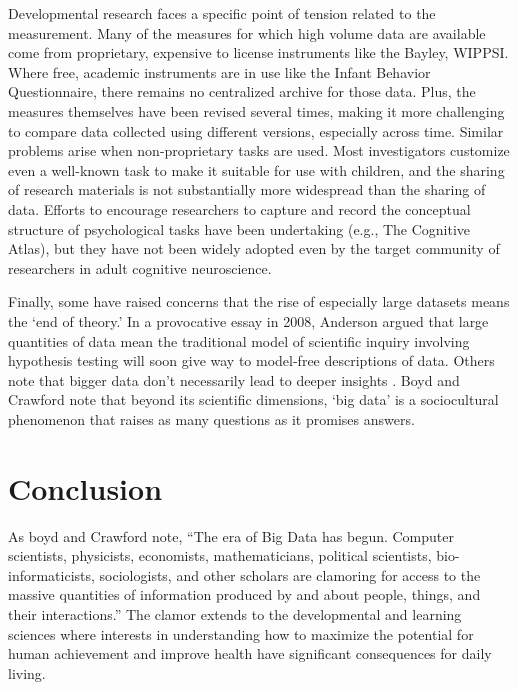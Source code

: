 \documentclass[letterpaper,man,apacite]{apa6}
\begin{document}
Developmental research faces a specific point of tension related to the measurement.
Many of the measures for which high volume data are available come from proprietary, expensive to license instruments like the Bayley, WIPPSI.
Where free, academic instruments are in use like the Infant Behavior Questionnaire, there remains no centralized archive for those data.
Plus, the measures themselves have been revised several times, making it more challenging to compare data collected using different versions, especially across time.
Similar problems arise when non-proprietary tasks are used.
Most investigators customize even a well-known task to make it suitable for use with children, and the sharing of research materials is not substantially more widespread than the sharing of data.
Efforts to encourage researchers to capture and record the conceptual structure of psychological tasks have been undertaking (e.g., The Cognitive Atlas), but they have not been widely adopted even by the target community of researchers in adult cognitive neuroscience.

Finally, some have raised concerns that the rise of especially large datasets means the `end of theory.' \cite{anderson_end_2008}
In a provocative essay in 2008, Anderson argued that large quantities of data mean the traditional model of scientific inquiry involving hypothesis testing will soon give way to model-free descriptions of data.
Others note that bigger data don't necessarily lead to deeper insights \cite{graham_big_2012}.
Boyd and Crawford note \cite{boyd_critical_2012} that beyond its scientific dimensions, `big data' is a sociocultural phenomenon that raises as many questions as it promises answers.

\section{Conclusion}

As boyd and Crawford \citeyear{boyd_critical_2012} note, ``The era of Big Data has begun. Computer scientists, physicists, economists, mathematicians, political scientists, bio-informaticists, sociologists, and other scholars are clamoring for access to the massive quantities of information produced by and about people, things, and their interactions.''
The clamor extends to the developmental and learning sciences where interests in understanding how to maximize the potential for human achievement and improve health have significant consequences for daily living.
\end{document}
